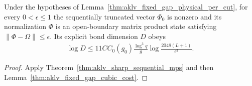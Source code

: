 \begin{lemma}
    \label{thm:aklv_fixed_gap_sequential_mps}
    \leanok
    Under the hypotheses of
    Lemma~\ref{thm:aklv_fixed_gap_physical_per_cut}, for every
    $0<\epsilon\le1$ the sequentially truncated vector $\Phi_0$ is nonzero
    and its normalization $\Phi$ is an open-boundary matrix product state
    satisfying $\lVert\Phi-\Omega\rVert\le\epsilon$.  Its explicit bond
    dimension $D$ obeys
    \begin{align*}
        \log D\le 11C C_0(g_0)\frac{\log^3q}{g}
        \log\frac{2048(L+1)}{\epsilon^2}.
    \end{align*}
\end{lemma}
\begin{proof}
    \leanok
    Apply Theorem~\ref{thm:aklv_sharp_sequential_mps} and then
    Lemma~\ref{thm:aklv_fixed_gap_cubic_cost}.
\end{proof}
